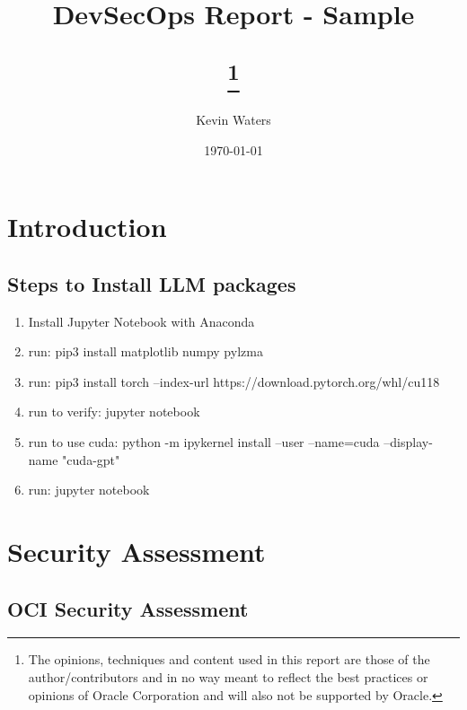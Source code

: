 \documentclass{report}
\title{ \vspace{40mm} \Huge {\textbf{DevSecOps Report - Sample }}    
\author{Kevin Waters }
\date{\today}
\thanks{The opinions, techniques and content used in this report are those of the author/contributors and in no way meant to reflect the best practices or opinions of 
Oracle Corporation and will also not be supported by Oracle.} }
\begin{document}
\maketitle
  
% 

\tableofcontents

\chapter{Introduction}
\newpage
\section{Steps to Install LLM packages}
\begin{enumerate}
    \item Install Jupyter Notebook with Anaconda
    \item run:   pip3 install matplotlib numpy pylzma
    \item run:   pip3 install torch --index-url https://download.pytorch.org/whl/cu118
    \item run to verify:   jupyter notebook
    \item run to use cuda:  python -m ipykernel install --user --name=cuda --display-name "cuda-gpt"
    \item run:   jupyter notebook
\end{enumerate}


% 

\chapter{Security Assessment}
\section{OCI Security Assessment}
% 


\newpage
\end{document}
